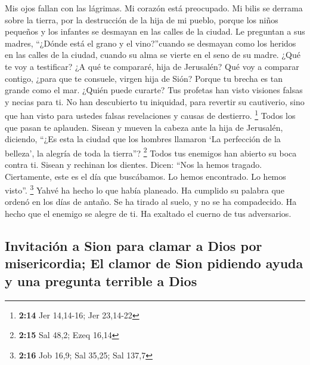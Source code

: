  Mis ojos fallan con las lágrimas. Mi corazón está
preocupado. Mi bilis se derrama sobre la tierra, por la destrucción de
la hija de mi pueblo, porque los niños pequeños y los infantes se
desmayan en las calles de la ciudad.  Le preguntan a sus
madres, ``¿Dónde está el grano y el vino?''cuando se desmayan como los
heridos en las calles de la ciudad, cuando su alma se vierte en el seno
de su madre.  ¿Qué te voy a testificar? ¿A qué te
compararé, hija de Jerusalén? Qué voy a comparar contigo, ¿para que te
consuele, virgen hija de Sión? Porque tu brecha es tan grande como el
mar. ¿Quién puede curarte?  Tus profetas han visto
visiones falsas y necias para ti. No han descubierto tu iniquidad, para
revertir su cautiverio, sino que han visto para ustedes falsas
revelaciones y causas de destierro. \footnote{\textbf{2:14} Jer
  14,14-16; Jer 23,14-22}  Todos los que pasan te
aplauden. Sisean y mueven la cabeza ante la hija de Jerusalén, diciendo,
``¿Es esta la ciudad que los hombres llamaron `La perfección de la
belleza', la alegría de toda la tierra''? \footnote{\textbf{2:15} Sal
  48,2; Ezeq 16,14}  Todos tus enemigos han abierto su
boca contra ti. Sisean y rechinan los dientes. Dicen: ``Nos la hemos
tragado. Ciertamente, este es el día que buscábamos. Lo hemos
encontrado. Lo hemos visto''. \footnote{\textbf{2:16} Job 16,9; Sal
  35,25; Sal 137,7}  Yahvé ha hecho lo que había
planeado. Ha cumplido su palabra que ordenó en los días de antaño. Se ha
tirado al suelo, y no se ha compadecido. Ha hecho que el enemigo se
alegre de ti. Ha exaltado el cuerno de tus adversarios.

\hypertarget{invitaciuxf3n-a-sion-para-clamar-a-dios-por-misericordia-el-clamor-de-sion-pidiendo-ayuda-y-una-pregunta-terrible-a-dios}{%
\subsection{Invitación a Sion para clamar a Dios por misericordia; El
clamor de Sion pidiendo ayuda y una pregunta terrible a
Dios}\label{invitaciuxf3n-a-sion-para-clamar-a-dios-por-misericordia-el-clamor-de-sion-pidiendo-ayuda-y-una-pregunta-terrible-a-dios}}

